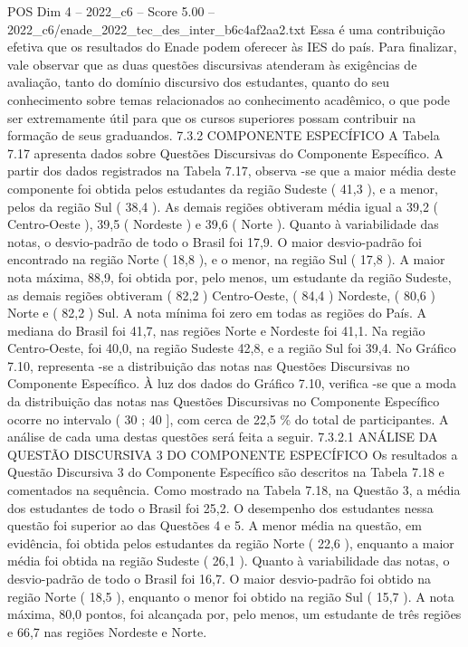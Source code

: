 \begin{textsample}{POS Dim 4 – 2022\_c6 – Score 5.00 – 2022\_c6/enade\_2022\_tec\_des\_inter\_b6c4af2aa2.txt}
Essa é uma contribuição efetiva que os resultados do Enade podem oferecer às IES do país.
Para finalizar, vale observar que as duas questões discursivas atenderam às exigências de avaliação, tanto do domínio discursivo dos estudantes, quanto do seu conhecimento sobre temas relacionados ao conhecimento acadêmico, o que pode ser extremamente útil para que os cursos superiores possam contribuir na formação de seus graduandos. 7.3.2 COMPONENTE ESPECÍFICO A Tabela 7.17 apresenta dados sobre Questões Discursivas do Componente Específico.
A partir dos dados registrados na Tabela 7.17, observa -se que a maior média deste componente foi obtida pelos estudantes da região Sudeste ( 41,3 ), e a menor, pelos da região Sul ( 38,4 ).
As demais regiões obtiveram média igual a 39,2 ( Centro-Oeste ), 39,5 ( Nordeste ) e 39,6 ( Norte ).
Quanto à variabilidade das notas, o desvio-padrão de todo o Brasil foi 17,9.
O maior desvio-padrão foi encontrado na região Norte ( 18,8 ), e o menor, na região Sul ( 17,8 ).
A maior nota máxima, 88,9, foi obtida por, pelo menos, um estudante da região Sudeste, as demais regiões obtiveram ( 82,2 ) Centro-Oeste, ( 84,4 ) Nordeste, ( 80,6 ) Norte e ( 82,2 ) Sul.
A nota mínima foi zero em todas as regiões do País.
A mediana do Brasil foi 41,7, nas regiões Norte e Nordeste foi 41,1.
Na região Centro-Oeste, foi 40,0, na região Sudeste 42,8, e a região Sul foi 39,4.
No Gráfico 7.10, representa -se a distribuição das notas nas Questões Discursivas no Componente Específico.
À luz dos dados do Gráfico 7.10, verifica -se que a moda da distribuição das notas nas Questões Discursivas no Componente Específico ocorre no intervalo ( 30 ; 40 ], com cerca de 22,5 \% do total de participantes.
A análise de cada uma destas questões será feita a seguir. 7.3.2.1 ANÁLISE DA QUESTÃO DISCURSIVA 3 DO COMPONENTE ESPECÍFICO Os resultados a Questão Discursiva 3 do Componente Específico são descritos na Tabela 7.18 e comentados na sequência.
Como mostrado na Tabela 7.18, na Questão 3, a média dos estudantes de todo o Brasil foi 25,2.
O desempenho dos estudantes nessa questão foi superior ao das Questões 4 e 5.
A menor média na questão, em evidência, foi obtida pelos estudantes da região Norte ( 22,6 ), enquanto a maior média foi obtida na região Sudeste ( 26,1 ).
Quanto à variabilidade das notas, o desvio-padrão de todo o Brasil foi 16,7.
O maior desvio-padrão foi obtido na região Norte ( 18,5 ), enquanto o menor foi obtido na região Sul ( 15,7 ).
A nota máxima, 80,0 pontos, foi alcançada por, pelo menos, um estudante de três regiões e 66,7 nas regiões Nordeste e Norte.

\end{textsample}
